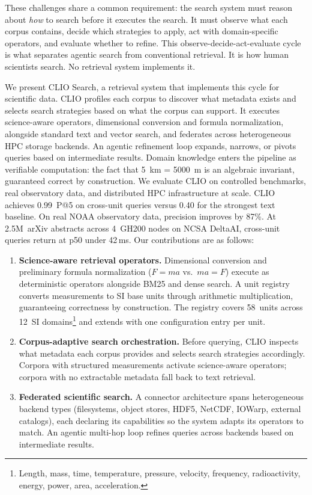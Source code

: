These challenges share a common requirement: the search system must reason about \emph{how} to search before it executes the search. It must observe what each corpus contains, decide which strategies to apply, act with domain-specific operators, and evaluate whether to refine. This observe-decide-act-evaluate cycle is what separates agentic search from conventional retrieval. It is how human scientists search. No retrieval system implements it.

We present CLIO Search, a retrieval system that implements this cycle for scientific data. CLIO profiles each corpus to discover what metadata exists and selects search strategies based on what the corpus can support. It executes science-aware operators, dimensional conversion and formula normalization, alongside standard text and vector search, and federates across heterogeneous HPC storage backends. An agentic refinement loop expands, narrows, or pivots queries based on intermediate results. Domain knowledge enters the pipeline as verifiable computation: the fact that 5~km = 5000~m is an algebraic invariant, guaranteed correct by construction. We evaluate CLIO on controlled benchmarks, real observatory data, and distributed HPC infrastructure at scale. CLIO achieves 0.99~P@5 on cross-unit queries versus 0.40 for the strongest text baseline. On real NOAA observatory data, precision improves by 87\%. At 2.5M~arXiv abstracts across 4~GH200 nodes on NCSA DeltaAI, cross-unit queries return at p50 under 42\,ms.
Our contributions are as follows:

\begin{enumerate}
\item \textbf{Science-aware retrieval operators.} Dimensional conversion and preliminary formula normalization ($F{=}ma$ vs.\ $ma{=}F$) execute as deterministic operators alongside BM25 and dense search. A unit registry converts measurements to SI base units through arithmetic multiplication, guaranteeing correctness by construction. The registry covers 58~units across 12~SI domains\footnote{Length, mass, time, temperature, pressure, velocity, frequency, radioactivity, energy, power, area, acceleration.} and extends with one configuration entry per unit.

\item \textbf{Corpus-adaptive search orchestration.} Before querying, CLIO inspects what metadata each corpus provides and selects search strategies accordingly. Corpora with structured measurements activate science-aware operators; corpora with no extractable metadata fall back to text retrieval.

\item \textbf{Federated scientific search.} A connector architecture spans heterogeneous backend types (filesystems, object stores, HDF5, NetCDF, IOWarp, external catalogs), each declaring its capabilities so the system adapts its operators to match. An agentic multi-hop loop refines queries across backends based on intermediate results.
\end{enumerate}
